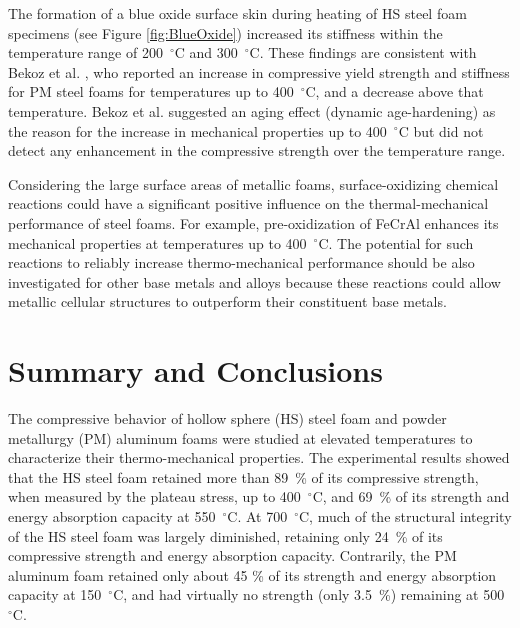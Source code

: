 \documentclass[review]{elsarticle}
\begin{document}
The formation of a blue oxide surface skin during heating of HS steel foam specimens (see Figure \ref{fig:BlueOxide}) increased its stiffness within the temperature range of 200~$^{\circ}\mathrm{C}$ and 300~$^{\circ}\mathrm{C}$. These findings are consistent with Bekoz et al. \cite{BekozOktay2014}, who reported an increase in compressive yield strength and stiffness for PM steel foams for temperatures up to 400~$^{\circ}\mathrm{C}$, and a decrease above that temperature. Bekoz et al. \cite{BekozOktay2014} suggested an aging effect (dynamic age-hardening) as the reason for the increase in mechanical properties up to 400~$^{\circ}\mathrm{C}$ but did not detect any enhancement in the compressive strength over the temperature range.

Considering the large surface areas of metallic foams, surface-oxidizing chemical reactions could have a significant positive influence on the thermal-mechanical performance of steel foams. For example, pre-oxidization of FeCrAl enhances its mechanical properties at temperatures up to 400~$^{\circ}\mathrm{C}$. The potential for such reactions to reliably increase thermo-mechanical performance should be also investigated for other base metals and alloys because these reactions could allow metallic cellular structures to outperform their constituent base metals.

\section{Summary and Conclusions}

The compressive behavior of hollow sphere (HS) steel foam and powder metallurgy (PM) aluminum foams were studied at elevated temperatures to characterize their thermo-mechanical properties. The experimental results showed that the HS steel foam retained more than 89~\% of its compressive strength, when measured by the plateau stress, up to 400~$^{\circ}\mathrm{C}$, and 69~\% of its strength and energy absorption capacity at 550~$^{\circ}\mathrm{C}$. At 700~$^{\circ}\mathrm{C}$, much of the structural integrity of the HS steel foam was largely diminished, retaining only 24~\% of its compressive strength and energy absorption capacity. Contrarily, the PM aluminum foam retained only about 45 \% of its strength and energy absorption capacity at 150~$^{\circ}\mathrm{C}$, and had virtually no strength (only 3.5~\%) remaining at 500~$^{\circ}\mathrm{C}$.
\end{document}

